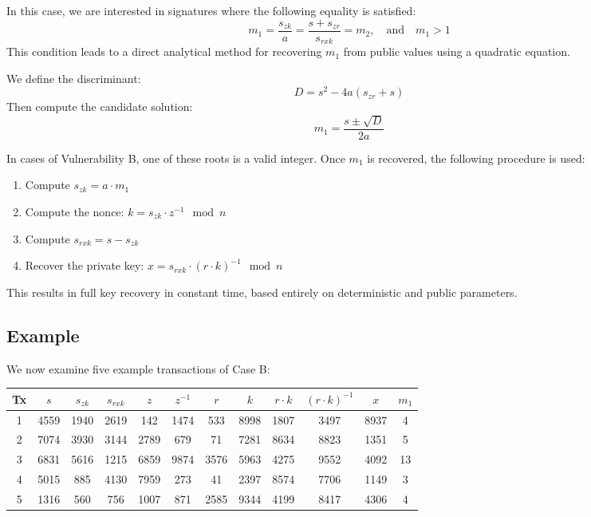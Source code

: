 \documentclass[11pt]{article}
\begin{document}
In this case, we are interested in signatures where the following equality is satisfied:
\[
m_1 = \frac{s_{zk}}{a} = \frac{s + s_{zr}}{s_{rxk}} = m_2,\quad \text{and} \quad m_1 > 1
\]
This condition leads to a direct analytical method for recovering $m_1$ from public values using a quadratic equation.

We define the discriminant:
\[
D = s^2 - 4a(s_{zr} + s)
\]
Then compute the candidate solution:
\[
m_1 = \frac{s \pm \sqrt{D}}{2a}
\]

In cases of Vulnerability B, one of these roots is a valid integer. Once $m_1$ is recovered, the following procedure is used:

\begin{enumerate}
    \item Compute $s_{zk} = a \cdot m_1$
    \item Compute the nonce: $k = s_{zk} \cdot z^{-1} \mod n$
    \item Compute $s_{rxk} = s - s_{zk}$
    \item Recover the private key: $x = s_{rxk} \cdot (r \cdot k)^{-1} \mod n$
\end{enumerate}

This results in full key recovery in constant time, based entirely on deterministic and public parameters.

\subsection{Example}
We now examine five example transactions of Case B:

\begin{center}
\small
\begin{tabular}{|c|c|c|c|c|c|c|c|c|c|c|c|}
\hline
Tx & $s$ & $s_{zk}$ & $s_{rxk}$ & $z$ & $z^{-1}$ & $r$ & $k$ & $r \cdot k$ & $(r \cdot k)^{-1}$ & $x$ & $m_1$ \\
\hline
1 & 4559 & 1940 & 2619 & 142 & 1474 & 533 & 8998 & 1807 & 3497  & 8937 & 4 \\
2 & 7074 & 3930 & 3144 & 2789 & 679 & 71 & 7281 & 8634 & 8823 & 1351 & 5 \\
3 & 6831 & 5616 & 1215 & 6859 & 9874 & 3576 & 5963 & 4275 & 9552 & 4092 & 13 \\
4 & 5015 & 885 & 4130 & 7959 & 273 & 41 & 2397 & 8574 & 7706 & 1149 & 3 \\
5 & 1316 & 560 & 756 & 1007 & 871 & 2585 & 9344 & 4199 & 8417 & 4306 & 4 \\
\hline
\end{tabular}
\end{center}
\end{document}
